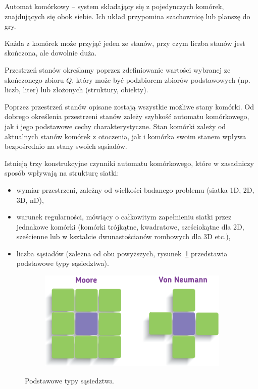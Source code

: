 Automat komórkowy – system składający się z pojedynczych komórek, znajdujących się obok siebie. Ich układ przypomina szachownicę lub planszę do gry.

Każda z komórek może przyjąć jeden ze stanów, przy czym liczba stanów jest skończona, ale dowolnie duża.

Przestrzeń stanów określamy poprzez zdefiniowanie wartości wybranej ze skończonego zbioru $ Q $, który może być podzbiorem zbiorów podstawowych (np. liczb, liter) lub złożonych (struktury, obiekty). 

Poprzez przestrzeń stanów opisane zostają wszystkie możliwe stany komórki. Od dobrego określenia przestrzeni stanów zależy szybkość automatu komórkowego, jak i jego podstawowe cechy charakterystyczne. Stan komórki zależy od aktualnych stanów komórek z otoczenia, jak i komórka swoim stanem wpływa bezpośrednio na stany swoich sąsiadów.

Istnieją trzy konstrukcyjne czynniki automatu komórkowego, które w zasadniczy sposób wpływają na strukturę siatki:
\begin{itemize}
\item wymiar przestrzeni, zależny od wielkości badanego problemu (siatka 1D, 2D, 3D, nD),
\item warunek regularności, mówiący o całkowitym zapełnieniu siatki przez jednakowe komórki (komórki trójkątne, kwadratowe, sześciokątne dla 2D, sześcienne lub w kształcie dwunastościanów rombowych dla 3D etc.),
\item liczba sąsiadów (zależna od obu powyższych, rysunek~\ref{neighbours} przedstawia podstawowe typy sąsiedztwa).
\end{itemize}

\begin{figure} [H]
	\centering
	\begin{subfigure}{.6\textwidth}
		\centering
		\includegraphics[width=1.0\linewidth]{EDMIIssues/Figures/sasiedztwa.png}
	\end{subfigure}
	\caption{Podstawowe typy sąsiedztwa.}
	\label{neighbours}
\end{figure} 

